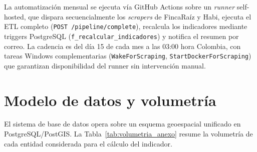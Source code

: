 \documentclass[12pt, a4paper, twoside, openright]{report}
\theoremstyle{plain}
\theoremstyle{definition}
\begin{document}
La automatización mensual se ejecuta vía GitHub Actions sobre un \emph{runner} self-hosted, que dispara secuencialmente los \emph{scrapers} de FincaRaíz y Habi, ejecuta el ETL completo (\texttt{POST /pipeline/complete}), recalcula los indicadores mediante triggers PostgreSQL (\texttt{f\_recalcular\_indicadores}) y notifica el resumen por correo. La cadencia es del día 15 de cada mes a las 03:00 hora Colombia, con tareas Windows complementarias (\texttt{WakeForScraping}, \texttt{StartDockerForScraping}) que garantizan disponibilidad del runner sin intervención manual.

\section{Modelo de datos y volumetría}\label{sec:anexo_volumetria}

El sistema de base de datos opera sobre un esquema geoespacial unificado en PostgreSQL/PostGIS. La Tabla~\ref{tab:volumetria_anexo} resume la volumetría de cada entidad considerada para el cálculo del indicador.
\end{document}
